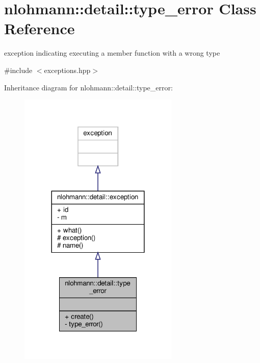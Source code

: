 \hypertarget{classnlohmann_1_1detail_1_1type__error}{}\section{nlohmann\+:\+:detail\+:\+:type\+\_\+error Class Reference}
\label{classnlohmann_1_1detail_1_1type__error}


exception indicating executing a member function with a wrong type  




{\ttfamily \#include $<$exceptions.\+hpp$>$}



Inheritance diagram for nlohmann\+:\+:detail\+:\+:type\+\_\+error\+:
\nopagebreak
\begin{figure}[H]
\begin{center}
\leavevmode
\includegraphics[width=216pt]{classnlohmann_1_1detail_1_1type__error__inherit__graph}
\end{center}
\end{figure}


